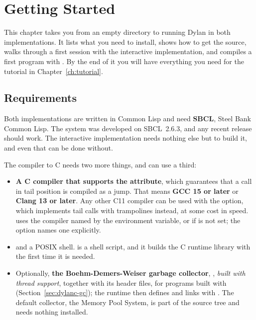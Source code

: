 \chapter{Getting Started}\label{ch:start}

This chapter takes you from an empty directory to running Dylan in both
implementations. It lists what you need to install, shows how to get the
source, walks through a first session with the interactive
implementation, and compiles a first program with . By the
end of it you will have everything you need for the tutorial in
Chapter~\ref{ch:tutorial}.

\section{Requirements}\label{sec:start-requirements}

Both implementations are written in Common Lisp and need \textbf{SBCL},
Steel Bank Common Lisp. The system was developed on SBCL~2.6.3, and any
recent release should work. The interactive implementation needs nothing
else but  to build it, and even that can be done without.

The compiler to C needs two more things, and can use a third:

\begin{itemize}
\item \textbf{A C compiler that supports the 
  attribute}, which guarantees that a call in tail position is compiled as
  a jump. That means \textbf{GCC 15 or later} or \textbf{Clang 13 or
  later}. Any other C11 compiler can be used with the 
  option, which implements tail calls with trampolines instead, at some
  cost in speed.  uses the compiler named by the 
  environment variable, or  if  is not set; the
   option names one explicitly.
\item \textbf{} and a POSIX shell.  is a shell
  script, and it builds the C runtime library with  the first
  time it is needed.
\item Optionally, \textbf{the Boehm-Demers-Weiser garbage collector},
  , \emph{built with thread support}, together with its
  header files, for programs built with 
  (Section~\ref{sec:dylanc-gc}); the runtime then defines
   and links with . The
  default collector, the Memory Pool System, is part of the source tree
  and needs nothing installed.
\end{itemize}

